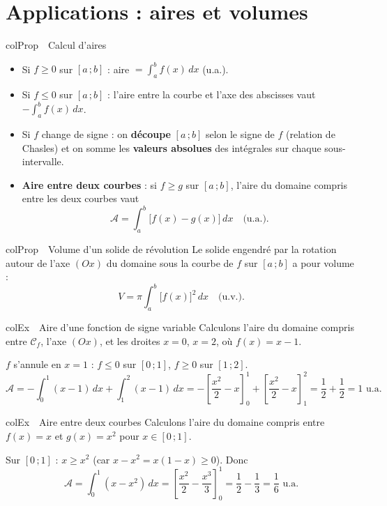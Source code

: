 \documentclass[11pt,a4paper]{article}
\newenvironment{propriete}[1][Propriété]
  {\begin{fiche}{colProp}{\ding{72}~~#1}}{\end{fiche}}
\newenvironment{exemple}[1][Exemple]
  {\begin{fiche}{colEx}{\ding{217}~~#1}}{\end{fiche}}
\begin{document}
\section{Applications : aires et volumes}

\begin{propriete}[Calcul d'aires]
\begin{itemize}[leftmargin=6mm, itemsep=0.5mm]
  \item Si $f\geq0$ sur $[a\,;b]$ : aire $=\displaystyle\int_a^bf(x)\,dx$ (u.a.).
  \item Si $f\leq0$ sur $[a\,;b]$ : l'aire entre la courbe et l'axe des abscisses vaut $-\displaystyle\int_a^bf(x)\,dx$.
  \item Si $f$ change de signe : on \textbf{découpe} $[a\,;b]$ selon le signe de $f$ (relation de Chasles) et on somme les \textbf{valeurs absolues} des intégrales sur chaque sous-intervalle.
  \item \textbf{Aire entre deux courbes} : si $f\geq g$ sur $[a\,;b]$, l'aire du domaine compris entre les deux courbes vaut
  \[
    \mathcal{A} = \int_a^b\bigl[f(x)-g(x)\bigr]\,dx \quad\text{(u.a.)}.
  \]
\end{itemize}
\end{propriete}

\begin{propriete}[Volume d'un solide de révolution]
Le solide engendré par la rotation autour de l'axe $(Ox)$ du domaine sous la courbe de $f$ sur $[a\,;b]$ a pour volume :
\[
  V = \pi\int_a^b\bigl[f(x)\bigr]^2\,dx \quad\text{(u.v.)}.
\]
\end{propriete}

\begin{exemple}[Aire d'une fonction de signe variable]
Calculons l'aire du domaine compris entre $\mathcal{C}_f$, l'axe $(Ox)$, et les droites $x=0$, $x=2$, où $f(x)=x-1$.

\smallskip
$f$ s'annule en $x=1$ : $f\leq0$ sur $[0\,;1]$, $f\geq0$ sur $[1\,;2]$.
\[
  \mathcal{A} = -\int_0^1(x-1)\,dx + \int_1^2(x-1)\,dx
  = -\left[\frac{x^2}2-x\right]_0^1 + \left[\frac{x^2}2-x\right]_1^2
  = \frac12+\frac12 = 1 \text{ u.a.}
\]
\end{exemple}

\begin{exemple}[Aire entre deux courbes]
Calculons l'aire du domaine compris entre $f(x)=x$ et $g(x)=x^2$ pour $x\in[0\,;1]$.

\smallskip
Sur $[0\,;1]$ : $x\geq x^2$ (car $x-x^2=x(1-x)\geq0$). Donc
\[
  \mathcal{A} = \int_0^1(x-x^2)\,dx = \left[\frac{x^2}2-\frac{x^3}3\right]_0^1 = \frac12-\frac13 = \frac16 \text{ u.a.}
\]
\end{exemple}
\end{document}
